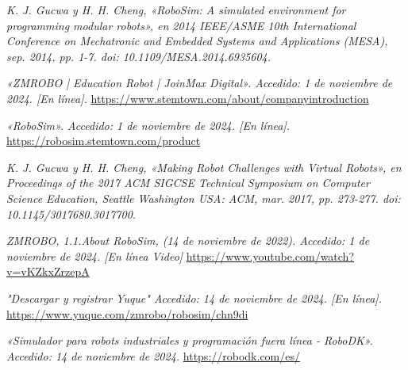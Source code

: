 \begin{thebibliography}{99}
    \textit{K. J. Gucwa y H. H. Cheng, «RoboSim: A simulated environment for programming modular robots», en 2014 IEEE/ASME 10th International Conference on Mechatronic and Embedded Systems and Applications (MESA), sep. 2014, pp. 1-7. doi: 10.1109/MESA.2014.6935604.}

    \textit{«ZMROBO | Education Robot | JoinMax Digital». Accedido: 1 de noviembre de 2024. [En línea].}
    \url{https://www.stemtown.com/about/companyintroduction}

    \textit{«RoboSim». Accedido: 1 de noviembre de 2024. [En línea].}
    \url{https://robosim.stemtown.com/product}

    \textit{K. J. Gucwa y H. H. Cheng, «Making Robot Challenges with Virtual Robots», en Proceedings of the 2017 ACM SIGCSE Technical Symposium on Computer Science Education, Seattle Washington USA: ACM, mar. 2017, pp. 273-277. doi: 10.1145/3017680.3017700.}

    \textit{ZMROBO, 1.1.About RoboSim, (14 de noviembre de 2022). Accedido: 1 de noviembre de 2024. [En línea Video]}
    \url{https://www.youtube.com/watch?v=vKZkxZrzepA}

    \textit{"Descargar y registrar Yuque" Accedido: 14 de noviembre de 2024. [En línea].}
    \url{https://www.yuque.com/zmrobo/robosim/chn9di}

    \textit{«Simulador para robots industriales y programación fuera línea - RoboDK». Accedido: 14 de noviembre de 2024.}
    \url{https://robodk.com/es/}
\end{thebibliography}